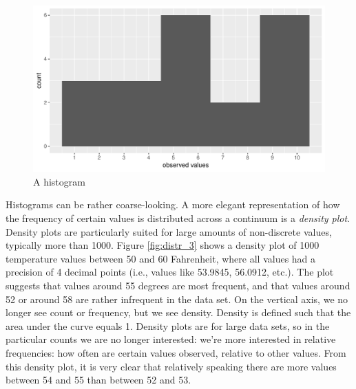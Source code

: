 \documentclass[]{report}\usepackage[]{graphicx}\usepackage[]{color}
\makeatletter
\def\maxwidth{ %
  \ifdim\Gin@nat@width>\linewidth
    \linewidth
  \else
    \Gin@nat@width
  \fi
}
\newenvironment{knitrout}{}{} %
\makeatother
\begin{document}
\begin{knitrout}
\color{fgcolor}\begin{figure}

{\centering \includegraphics[width=\maxwidth]{figure/distr_2-1} 

}

\caption[A histogram]{A histogram}\label{fig:distr_2}
\end{figure}


\end{knitrout}


Histograms can be rather coarse-looking. A more elegant representation of how the frequency of certain values is distributed across a continuum is a \textit{density plot}. Density plots are particularly suited for large amounts of non-discrete values, typically more than 1000. Figure \ref{fig:distr_3} shows a density plot of 1000 temperature values between 50 and 60 Fahrenheit, where all values had a precision of 4 decimal points (i.e., values like 53.9845, 56.0912, etc.). The plot suggests that values around 55 degrees are most frequent, and that values around 52 or around 58 are rather infrequent in the data set. On the vertical axis, we no longer see count or frequency, but we see density. Density is defined such that the area under the curve equals 1. Density plots are for large data sets, so in the particular counts we are no longer interested: we're more interested in relative frequencies: how often are certain values observed, relative to other values. From this density plot, it is very clear that relatively speaking there are more values between 54 and 55 than between 52 and 53. 
 
\end{document}

